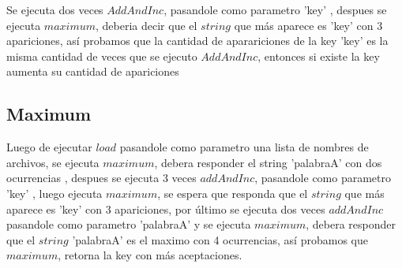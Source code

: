 Se ejecuta dos veces $AddAndInc$, pasandole como parametro 'key' , despues se
ejecuta $maximum$, deberia decir que el $string$ que más aparece es 'key' con 3
apariciones, así probamos que la cantidad de aparariciones de la key 'key' es
la misma cantidad de veces que se ejecuto $AddAndInc$, entonces si existe la
key aumenta su cantidad de apariciones

\subsection{Maximum}

Luego de ejecutar $load$ pasandole como parametro una lista de nombres de
archivos, se ejecuta $maximum$, debera responder el string 'palabraA' con dos
ocurrencias , despues se ejecuta 3 veces $addAndInc$, pasandole como parametro
'key' , luego ejecuta $maximum$, se espera que responda que el $string$ que más
aparece es 'key' con 3 apariciones, por último se ejecuta dos veces $addAndInc$
pasandole como parametro 'palabraA' y se ejecuta $maximum$, debera responder
que el $string$  'palabraA' es el maximo con 4 ocurrencias, así probamos que
$maximum$, retorna la key con más aceptaciones.

